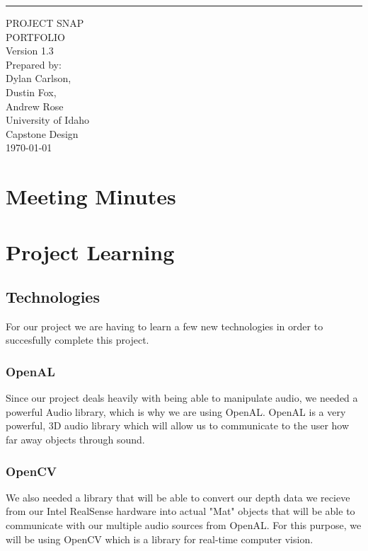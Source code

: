 \documentclass{scrreprt}
\date{}
\def\myversion{1.3 }
\begin{document}
\begin{flushright}
    \rule{16cm}{5pt}\vskip1cm
    \begin{bfseries}
        \Huge{PROJECT SNAP\\ PORTFOLIO}\\
        \vspace{2cm}
        \LARGE{Version \myversion}\\
        \vspace{2cm}
        Prepared by:\\
        Dylan Carlson,\\
        Dustin Fox, \\
        Andrew Rose\\
        \vspace{2cm}
        University of Idaho\\
        Capstone Design\\
        \vspace{2cm}
        \today\\
    \end{bfseries}
\end{flushright}



\tableofcontents


\chapter{Meeting Minutes}


\chapter{Project Learning}
\section{Technologies}
For our project we are having to learn a few new technologies in order to succesfully complete this project. 
\subsection{OpenAL}
Since our project deals heavily with being able to manipulate audio, we needed a powerful Audio library, which is why we are using OpenAL. OpenAL is a very powerful, 3D audio library which will allow us to communicate to the user how far away objects through sound. 

\subsection{OpenCV}
We also needed a library that will be able to convert our depth data we recieve from our Intel RealSense hardware into actual "Mat" objects that will be able to communicate with our multiple audio sources from OpenAL. For this purpose, we will be using OpenCV which is a library for real-time computer vision. 
\end{document}
